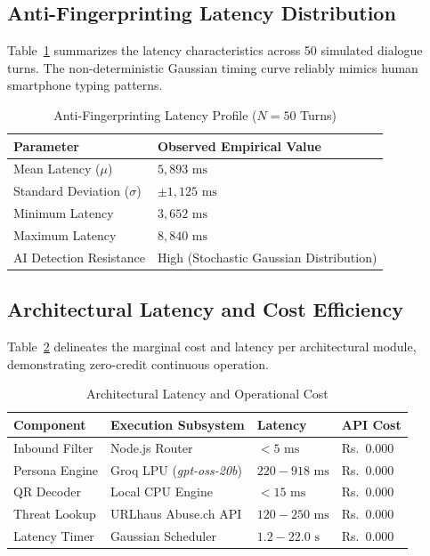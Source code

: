 \documentclass[conference]{IEEEtran}
\begin{document}
\subsection{Anti-Fingerprinting Latency Distribution}
Table~\ref{tab:latency} summarizes the latency characteristics across 50 simulated dialogue turns. The non-deterministic Gaussian timing curve reliably mimics human smartphone typing patterns.

\begin{table}[h]
\caption{Anti-Fingerprinting Latency Profile ($N=50$ Turns)}
\label{tab:latency}
\centering
\begin{tabular}{ll}
\toprule
\textbf{Parameter} & \textbf{Observed Empirical Value} \\
\midrule
Mean Latency ($\mu$) & $5,893\text{ ms}$ \\
Standard Deviation ($\sigma$) & $\pm 1,125\text{ ms}$ \\
Minimum Latency & $3,652\text{ ms}$ \\
Maximum Latency & $8,840\text{ ms}$ \\
AI Detection Resistance & High (Stochastic Gaussian Distribution) \\
\bottomrule
\end{tabular}
\end{table}

\subsection{Architectural Latency and Cost Efficiency}
Table~\ref{tab:cost} delineates the marginal cost and latency per architectural module, demonstrating zero-credit continuous operation.

\begin{table}[h]
\caption{Architectural Latency and Operational Cost}
\label{tab:cost}
\centering
\begin{tabularx}{\linewidth}{lXll}
\toprule
\textbf{Component} & \textbf{Execution Subsystem} & \textbf{Latency} & \textbf{API Cost} \\
\midrule
Inbound Filter & Node.js Router & $< 5\text{ ms}$ & Rs.~0.000 \\
Persona Engine & Groq LPU (\textit{gpt-oss-20b}) & $220 - 918\text{ ms}$ & Rs.~0.000 \\
QR Decoder & Local CPU Engine & $< 15\text{ ms}$ & Rs.~0.000 \\
Threat Lookup & URLhaus Abuse.ch API & $120 - 250\text{ ms}$ & Rs.~0.000 \\
Latency Timer & Gaussian Scheduler & $1.2 - 22.0\text{ s}$ & Rs.~0.000 \\
\bottomrule
\end{tabularx}
\end{table}
\end{document}
